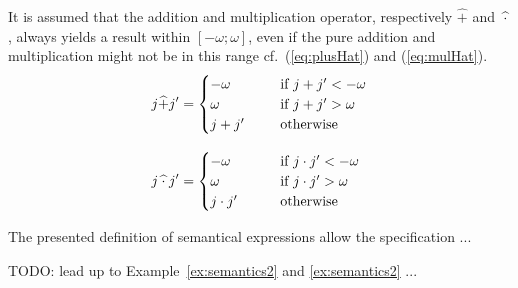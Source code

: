 \begin{definition}
It is assumed that the addition and multiplication operator, respectively $\widehat{+}$ and $\widehat{\hspace{2.5pt} \cdot \hspace{2.5pt} }$, always yields a result within $[-\omega;\omega]$, even if the pure addition and multiplication might not be in this range cf.\ (\ref{eq:plusHat}) and (\ref{eq:mulHat}).
\begin{align}
    j \widehat{+} j' &= 
\begin{cases}
    -\omega        & \text{if } j + j' < -\omega\\    
    \omega         & \text{if } j + j' > \omega \\
    \makebox[40pt][l]{$j + j'$}         & \text{otherwise}
\end{cases}
\label{eq:plusHat}
\\[.8em]
    j \widehat{\hspace{2.5pt} \cdot \hspace{2.5pt}} j' &= 
\begin{cases}
    -\omega        & \text{if } j \cdot j' < -\omega\\    
    \omega         & \text{if } j \cdot j' > \omega \\
    \makebox[40pt][l]{$j \cdot j'$}         & \text{otherwise}
\end{cases}
\label{eq:mulHat}
\end{align}

\label{def:semanticExpressions}
\done
\end{definition}

The presented definition of semantical expressions allow the specification ...

TODO: lead up to Example~\ref{ex:semantics2} and \ref{ex:semantics2} ...

